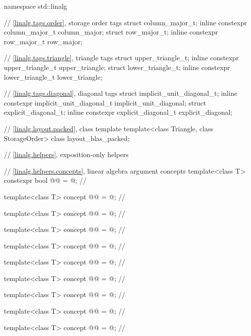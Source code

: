 %
\begin{codeblock}
namespace std::linalg {
  // \ref{linalg.tags.order}, storage order tags
  struct column_major_t;
  inline constexpr column_major_t column_major;
  struct row_major_t;
  inline constexpr row_major_t row_major;

  // \ref{linalg.tags.triangle}, triangle tags
  struct upper_triangle_t;
  inline constexpr upper_triangle_t upper_triangle;
  struct lower_triangle_t;
  inline constexpr lower_triangle_t lower_triangle;

  // \ref{linalg.tags.diagonal}, diagonal tags
  struct implicit_unit_diagonal_t;
  inline constexpr implicit_unit_diagonal_t implicit_unit_diagonal;
  struct explicit_diagonal_t;
  inline constexpr explicit_diagonal_t explicit_diagonal;

  // \ref{linalg.layout.packed}, class template 
  template<class Triangle, class StorageOrder>
    class layout_blas_packed;

  // \ref{linalg.helpers}, exposition-only helpers

  // \ref{linalg.helpers.concepts}, linear algebra argument concepts
  template<class T>
    constexpr bool @@ = @\seebelow@;               // \expos

  template<class T>
    concept @@ = @\seebelow@;                      // \expos

  template<class T>
    concept @@ = @\seebelow@;                     // \expos

  template<class T>
    concept @@ = @\seebelow@;                   // \expos

  template<class T>
    concept @@ = @\seebelow@;                      // \expos

  template<class T>
    concept @@ = @\seebelow@;                     // \expos

  template<class T>
    concept @@ = @\seebelow@;                   // \expos

  template<class T>
    concept @@ = @\seebelow@;     // \expos

  template<class T>
    concept @@ = @\seebelow@;                      // \expos

  template<class T>
    concept @@ = @\seebelow@;                     // \expos

}
\end{codeblock}
